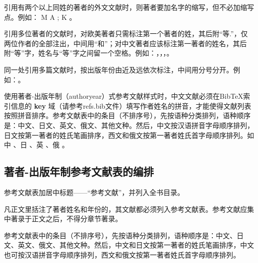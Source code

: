 引用有两个以上同姓的著者的外文文献时，则著者要加名字的缩写，但不必加缩写点。例如： M A \citet{nadkarni1992}; K \citet{nadkarni1992mechanism}。


引用多位著者的文献时，对欧美著者只需标注第一个著者的姓，其后附“等.”，仅两位作者的全部注出，中间用“和”；对中文著者应该标注第一著者的姓名，其后附“等”字，姓名与“等”字之间留一个空格。例如：\citet{nadkarni1992}，\citet{nair1992}，\citet{zhu1973}，\citet{hua1973}。


同一处引用多篇文献时，按出版年份由近及远依次标注，中间用分号分开。例如：\citet{nadkarni1992,hua1973,huo1981,timoshenko1959,ding2001}。


使用著者-出版年制（authoryear）式参考文献样式时，中文文献必须在BibTeX索引信息的 \textbf{key} 域（请参考refs.bib文件）填写作者姓名的拼音，才能使得文献列表按照拼音排序。参考文献表中的条目（不排序号），先按语种分类排列，语种顺序是：中文、日文、英文、俄文、其他文种。然后，中文按汉语拼音字母顺序排列，日文按第一著者的姓氏笔画排序，西文和俄文按第一著者姓氏首字母顺序排列。如中 \citep{niu2013zonghe}、日 \citep{Bohan1928}、英 \citep{stamerjohanns2009mathml}、俄 \citep{Dubrovin1906}。

\subsection{著者-出版年制参考文献表的编排}

参考文献表加居中标题——“参考文献”，并列入全书目录。

凡正文里括注了著者姓名和年份的，其文献都必须列入参考文献表。参考文献应集中著录于正文之后，不得分章节著录。

参考文献表中的条目（不排序号），先按语种分类排列，语种顺序是：中文、日文、英文、俄文、其他文种。然后，中文和日文按第一著者的姓氏笔画排序，中文也可按汉语拼音字母顺序排列，西文和俄文按第一著者姓氏首字母顺序排列。

